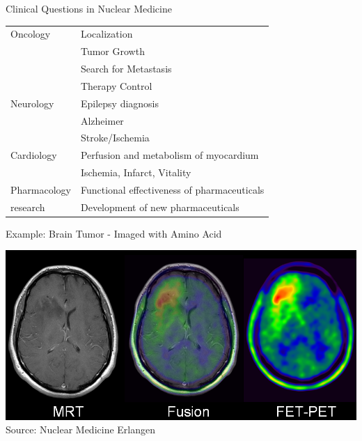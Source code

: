 \begin{frame}{Clinical Questions in Nuclear Medicine}
    \begin{table}[ht]
        \begin{tabular}{l | l}
            Oncology     & Localization                                \\
                         & Tumor Growth                                \\
                         & Search for Metastasis                       \\
                         & Therapy Control                             \\
            \hline
            Neurology    & Epilepsy diagnosis                          \\
                         & Alzheimer                                   \\
                         & Stroke/Ischemia                             \\
            \hline
            Cardiology   & Perfusion and metabolism of myocardium      \\
                         & Ischemia, Infarct, Vitality                 \\
            \hline
            Pharmacology & Functional effectiveness of pharmaceuticals \\
            research     & Development of new pharmaceuticals          \\
        \end{tabular}
    \end{table}
\end{frame}

\begin{frame}{Example: Brain Tumor - Imaged with Amino Acid}
    \begin{center}\includegraphics[height=0.8\textheight]{images/fetpet}\\
        {\scriptsize Source: Nuclear Medicine Erlangen}\\
    \end{center}
\end{frame}

